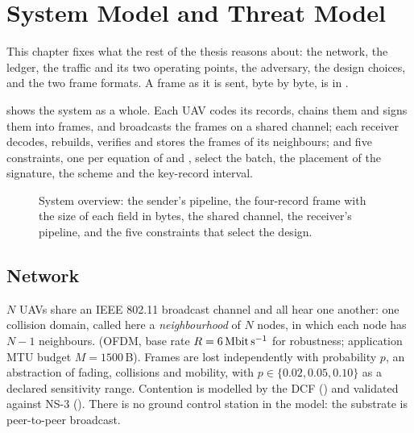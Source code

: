 \chapter{System Model and Threat Model}\label{ch:sysmodel}

This chapter fixes what the rest of the thesis reasons about: the network, the ledger, the
traffic and its two operating points, the adversary, the design choices, and the two frame
formats. A frame as it is sent, byte by byte, is in .

 shows the system as a whole. Each UAV codes its records, chains them and
signs them into frames, and broadcasts the frames on a shared channel; each receiver decodes,
rebuilds, verifies and stores the frames of its neighbours; and five constraints, one per
equation of  and , select the batch, the placement of the
signature, the scheme and the key-record interval.

\providecommand{\ba}{\ensuremath{g_a}}
\newcommand{\figoverviewref}[1]{\csname figoverviewref#1\endcsname}
\newcommand{\figoverviewreffresh}{\Cref{sec:freshness-convention}}
\newcommand{\figoverviewrefv}{\Cref{thm:t3prime}}
\newcommand{\figoverviewrefline}{Eq.~\eqref{eq:line}}
\newcommand{\figoverviewrefcpu}{\Cref{sec:e4}}
\newcommand{\figoverviewrefexcl}{\Cref{thm:t6}}
\begin{figure}[htbp]\centering

\caption{System overview: the sender's pipeline, the four-record frame with the size of each
field in bytes, the shared channel, the receiver's pipeline, and the five constraints that
select the design.}
\label{fig:system}
\end{figure}

\section{Network}

$N$ UAVs share an IEEE 802.11 broadcast channel and all hear one another: one collision domain,
called here a \emph{neighbourhood} of $N$ nodes, in which each node has $N-1$ neighbours. (OFDM, base rate $R = \SI{6}{\mega\bit\per\second}$
for robustness; application MTU budget $M = 1500$\,B). Frames are lost independently with
probability $p$, an abstraction of fading, collisions and mobility, with $p \in \{0.02, 0.05,
0.10\}$ as a declared sensitivity range. Contention is modelled by the DCF () and
validated against NS-3 (). There is no ground control station in the model: the
substrate is peer-to-peer broadcast.


